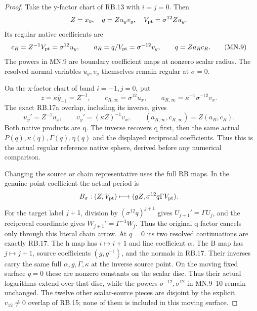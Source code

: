 \begin{proof}
Take the y-factor chart of RB.13 with \(i=j=0\). Then
\[
 Z=x_0,\quad q=Zu_yv_y,\quad
 V_{\rm pt}=\sigma^{12}Z u_y.
\]
Its regular native coefficients are
\[
 c_R=Z^{-1}V_{\rm pt}=\sigma^{12}u_y,\qquad
 a_R=q/V_{\rm pt}=\sigma^{-12}v_y,
 \qquad q=Za_Rc_R.
 \tag{MN.9}
\]
The powers in MN.9 are boundary coefficient maps at nonzero scalar
radius. The resolved normal variables \(u_y,v_y\) themselves
remain regular at \(\sigma=0\).

On the x-factor chart of band \(i=-1,j=0\), put
\[
 z=\kappa\bar y_{-1}=Z^{-1},\qquad
 c_{R,\infty}=\sigma^{12}u_x,\qquad
 a_{R,\infty}=\kappa^{-1}\sigma^{-12}v_x.
 \tag{MN.10}
\]
The exact RB.17a overlap, including its inverse, gives
\[
 u_y'=Z^{-1}u_x,\qquad v_y'=(\kappa Z)^{-1}v_x,
\qquad
 (a_{R,\infty},c_{R,\infty})=Z(a_R,c_R).
 \tag{MN.11}
\]
Both native products are q. The inverse recovers q first, then
the same actual \(P(q),\kappa(q),\Gamma(q),\eta(q)\) and the
displayed reciprocal coefficients. Thus this is the actual regular
reference native sphere, derived before any numerical comparison.

Changing the source or chain representative uses the full RB maps.
In the genuine point coefficient the actual period is
\[
 B_\sigma:(Z,V_{\rm pt})\longmapsto
       (gZ,\sigma^{12}q\Gamma V_{\rm pt}).
\]
For the target label \(j+1\), division by
\((\sigma^{12}q)^{j+1}\) gives \(U_{j+1}'=\Gamma U_j\),
and the reciprocal coordinate gives \(W_{j+1}'=\Gamma^{-1}W_j\).
Thus the original q factor cancels only through this literal chain
arrow. At \(q=0\) its two resolved continuations are exactly RB.17.
The h map has \(i\mapsto i+1\) and line coefficient \(\alpha\).
The B map has \(j\mapsto j+1\), source coefficients
\((g,g^{-1})\), and the normals in RB.17. Their inverses carry
the same full \(\alpha,g,\Gamma,\kappa\) at the inverse source
point. On the moving fixed surface \(q=0\) these are nonzero constants
on the scalar disc. Thus their actual logarithms extend over that
disc, while the powers \(\sigma^{-12},\sigma^{12}\) in
MN.9--10 remain unchanged. The twelve other scalar-source pieces
are disjoint by the explicit \(v_{12}\ne0\) overlap of RB.15;
none of them is included in this moving surface.


\end{proof}
